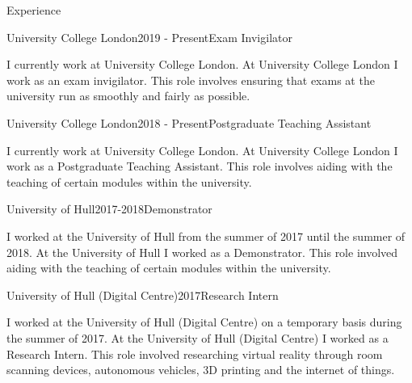 \documentclass{cv}
\begin{document}
\begin{rSection}{Experience}
\begin{rSubsection}{University College London}{2019 - Present}{Exam Invigilator}{}
\item I currently work at University College London. At University College London I work as an exam invigilator. This role involves ensuring that exams at the university run as smoothly and fairly as possible.
\end{rSubsection}

\begin{rSubsection}{University College London}{2018 - Present}{Postgraduate Teaching Assistant}{}
\item I currently work at University College London. At University College London I work as a Postgraduate Teaching Assistant. This role involves aiding with the teaching of certain modules within the university.
\end{rSubsection}

\begin{rSubsection}{University of Hull}{2017-2018}{Demonstrator}{}
\item I worked at the University of Hull from the summer of 2017 until the summer of 2018. At the University of Hull I worked as a Demonstrator. This role involved aiding with the teaching of certain modules within the university.
\end{rSubsection}

\begin{rSubsection}{University of Hull (Digital Centre)}{2017}{Research Intern}{}
\item I worked at the University of Hull (Digital Centre) on a temporary basis during the summer of 2017. At the University of Hull (Digital Centre) I worked as a Research Intern. This role involved researching virtual reality through room scanning devices, autonomous vehicles, 3D printing and the internet of things.
\end{rSubsection}
\end{rSection}
\end{document}
